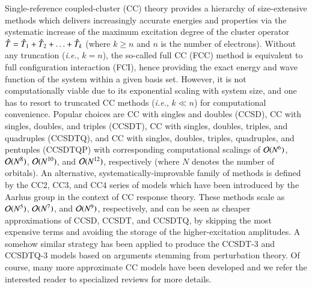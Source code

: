 \documentclass[aip,jcp,reprint,noshowkeys,superscriptaddress]{revtex4-1}
\newcommand{\ie}{\textit{i.e.}}
\newcommand{\hT}{\Hat{T}}
\begin{document}
Single-reference coupled-cluster (CC) theory provides a hierarchy of size-extensive methods which delivers increasingly accurate energies and properties via the systematic increase of the maximum excitation degree of the cluster operator $\hT = \hT_1 + \hT_2 + \ldots + \hT_k$ (where $k \ge n$ and $n$ is the number of electrons). \cite{Cizek_1966,Paldus_1972,Crawford_2000,Bartlett_2007,Shavitt_2009}
Without any truncation (\ie, $k = n$), the so-called full CC (FCC) method is equivalent to full configuration interaction (FCI), hence providing the exact energy and wave function of the system within a given basis set.
However, it is not computationally viable due to its exponential scaling with system size, and one has to resort to truncated CC methods  (\ie, $k \ll n$) for computational convenience.
Popular choices are CC with singles and doubles (CCSD), \cite{Cizek_1966,Purvis_1982} CC with singles, doubles, and triples (CCSDT), \cite{Noga_1987a,Scuseria_1988} CC with singles, doubles, triples, and quadruples (CCSDTQ), \cite{Oliphant_1991,Kucharski_1992} and 
CC with singles, doubles, triples, quadruples, and pentuples (CCSDTQP) \cite{Hirata_2000,Kallay_2001} with corresponding computational scalings of $\order*{N^{6}}$, $\order*{N^{8}}$,  $\order*{N^{10}}$, and  $\order*{N^{12}}$, respectively (where $N$ denotes the number of orbitals).
An alternative, systematically-improvable family of methods is defined by the CC2, \cite{Christiansen_1995a} CC3, \cite{Christiansen_1995b,Koch_1997} and CC4 \cite{Kallay_2005} series of models which have been introduced by the Aarhus group in the context of CC response theory. \cite{Christiansen_1998}
These methods scale as $\order*{N^{5}}$, $\order*{N^{7}}$, and $\order*{N^{9}}$, respectively, and can be seen as cheaper approximations of CCSD, CCSDT, and CCSDTQ, by skipping the most expensive terms and avoiding the storage of the higher-excitation amplitudes.
A somehow similar strategy has been applied to produce the CCSDT-3 \cite{Urban_1985,Noga_1987b} and CCSDTQ-3 \cite{Kallay_2005} models based on arguments stemming from perturbation theory.
Of course, many more approximate CC models have been developed and we refer the interested reader to specialized reviews for more details. \cite{Crawford_2000,Piecuch_2002,Bartlett_2007,Shavitt_2009}
\end{document}
